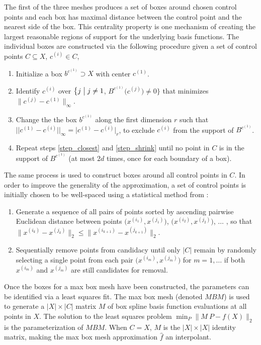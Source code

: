The first of the three meshes produces a set of boxes around chosen control points and each box has maximal distance between the control point and the nearest side of the box. This centrality property is one mechanism of creating the largest reasonable regions of support for the underlying basis functions. The individual boxes are constructed via the following procedure given a set of control points $C \subseteq X$, $c^{(i)} \in C$,
\begin{enumerate}
  \item Initialize a box $b^{c^{(1)}} \supset X$ with center $c^{(1)}$. \label{step_init}
  \item Identify $c^{(i)}$ over $\bigl\{ j \bigm| j \ne 1$, $B^{c^{(1)}}\bigl( c^{(j)} \bigr) \ne 0 \bigr\}$ that minimizes $\bigl\|c^{(j)}-c^{(1)}\bigr\|_\infty$.  \label{step_closest}
  \item Change the the box $b^{c^{(1)}}$ along the first dimension $r$ such that $\bigl|\bigl|c^{(1)} - c^{(i)}\bigr|\bigr|_\infty = \bigl\vert c^{(1)} - c^{(i)}\bigr\vert_r $, to exclude $c^{(i)}$ from the support of $B^{c^{(1)}}$. \label{step_shrink}
  \item Repeat steps \ref{step_closest} and \ref{step_shrink} until no point in $C$ is in the support of $B^{c^{(1)}}$ (at most $2d$ times, once for each boundary of a box).
\end{enumerate}

The same process is used to construct boxes around all control points in $C$. In order to improve the generality of the approximation, a set of control points is initially chosen to be well-spaced using a statistical method from \cite{amos2014algorithm}:

\begin{enumerate}
\item Generate a sequence of all pairs of points sorted by ascending pairwise Euclidean distance between points $\bigl(x^{(i_1)},x^{(j_1)}\bigr)$, $\bigl(x^{(i_2)},x^{(j_2)}\bigr)$, $\ldots$ , so that $\bigl\|x^{(i_k)}-x^{(j_k)}\bigr\|_2 \leq \bigl\|x^{(i_{k+1})}-x^{(j_{k+1})}\bigr\|_2$.
\item Sequentially remove points from candidacy until only $|C|$ remain by randomly selecting a single point from each pair $\bigl(x^{(i_m)}, x^{(j_m)}\bigr)$ for $m = 1,\ldots$ if both $x^{(i_m)}$ and $x^{(j_m)}$ are still candidates for removal.
\end{enumerate}

Once the boxes for a max box mesh have been constructed, the parameters can be identified via a least squares fit. The max box mesh (denoted $MBM$) is used to generate a $|X| \times |C|$ matrix $M$ of box spline basis function evaluations at all points in $X$. The solution to the least squares problem $\min_P \bigl\| M \ P - f(X) \bigr\|_2$ is the parameterization of $MBM$. When $C = X$, $M$ is the $|X| \times |X|$ identity matrix, making the max box mesh approximation $\hat f$ an interpolant.

